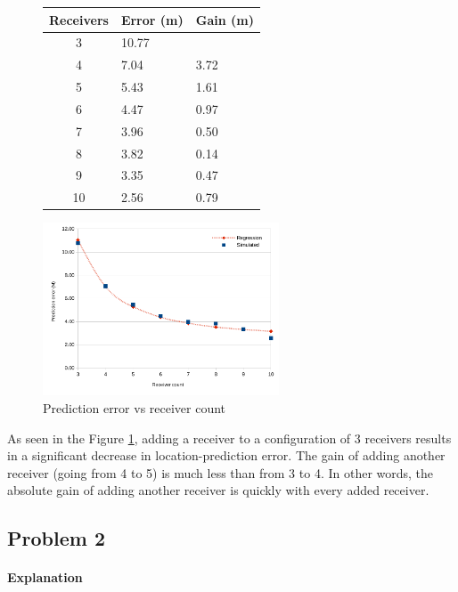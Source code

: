 \documentclass[10pt,a4paper]{book}
\begin{document}
\begin{figure}[H]
\begin{minipage}{50mm}
\small
\begin{tabular}{c|l|l}
\textbf{Receivers} & \textbf{Error (m)} & \textbf{Gain (m)} \\ \hline
3 & 10.77 &  \\ 
4 & 7.04 & 3.72 \\
5 & 5.43 & 1.61 \\
6 & 4.47 & 0.97 \\
7 & 3.96 & 0.50 \\
8 & 3.82 & 0.14 \\
9 & 3.35 & 0.47 \\
10 & 2.56 & 0.79 \\

\end{tabular}
\end{minipage}
\begin{minipage}{80mm}
\includegraphics[width=70mm]{receivervalue.pdf}
\end{minipage}
\caption{Prediction error vs receiver count}
\label{predictionerrorreceivercount}
\end{figure}

As seen in the Figure \ref{predictionerrorreceivercount}, adding a receiver to a configuration of 3 receivers results in a significant decrease in location-prediction error. The gain of adding another receiver (going from 4 to 5) is much less than from 3 to 4. In other words, the absolute gain of adding another receiver is quickly with every added receiver.



\newpage
\subsection{Problem 2}
\paragraph{Explanation}
\end{document}
